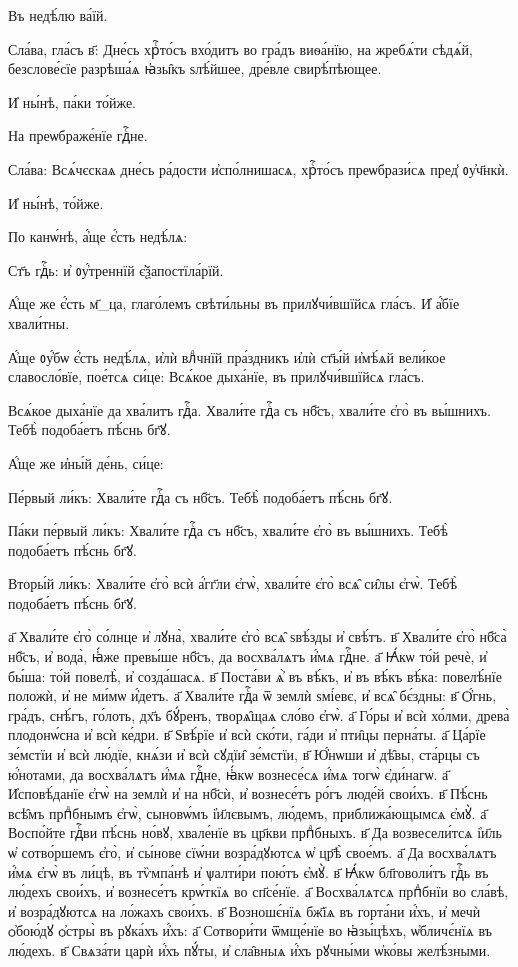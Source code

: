 \hKv Въ недѣ́лю ва́їй. 

\hKv Сла́ва, гла́съ в҃: Дне́сь хрⷭ҇то́съ вхо́дитъ во гра́дъ  виѳа́нїю, на жребѧ́ти сѣдѧ́й, безслове́сїе разрѣша́ѧ  ꙗ҆зы̑къ ѕлѣ́йшее, дре́вле свирѣ́пѣющее. 

\hKv И҆ ны́нѣ, па́ки то́йже. 

\hKv На преѡбраже́нїе гдⷭ҇не. 

\hKv Сла́ва: Всѧ́чєскаѧ дне́сь ра́дости и҆спо́лнишасѧ, хрⷭ҇то́съ  преѡбрази́сѧ пред̾ ᲂу҆ч҃нкѝ. 

\hKv И҆ ны́нѣ, то́йже. 

\hKv По канѡ́нѣ, а҆́ще є҆́сть недѣ́лѧ:  

\hKv Ст҃ъ гдⷭ҇ь: и҆ ᲂу҆́треннїй є҆ѯапостїла́рїй. 

\hKv А҆́ще же є҆́сть м҃_ца, глаго́лемъ свѣти́льны въ  прилꙋчи́вшїйсѧ гла́съ. И҆ а҆́бїе хвали́тны.  

\hKv А҆́ще ᲂу҆́бѡ є҆́сть недѣ́лѧ, и҆лѝ влⷣчнїй пра́здникъ  и҆лѝ ст҃ы́й и҆мѣ́ѧй вели́кое славосло́вїе, пое́тсѧ си́це:  Всѧ́кое дыха́нїе, въ прилꙋчи́вшїйсѧ гла́съ. 

\hKv Всѧ́кое дыха́нїе да хва́литъ гдⷭ҇а. Хвали́те гдⷭ҇а съ нб҃съ,  хвали́те є҆го̀ въ вы́шнихъ. Тебѣ̀ подоба́етъ пѣ́снь бг҃ꙋ. 

\hKv А҆́ще же и҆ны́й де́нь, си́це: 

\hKv Пе́рвый ли́къ: Хвали́те гдⷭ҇а съ нб҃съ. Тебѣ̀ подоба́етъ  пѣ́снь бг҃ꙋ. 

\hKv Па́ки пе́рвый ли́къ: Хвали́те гдⷭ҇а съ нб҃съ, хвали́те  є҆го̀ въ вы́шнихъ. Тебѣ̀ подоба́етъ пѣ́снь бг҃ꙋ. 

\hKv Вторы́й ли́къ: Хвали́те є҆го̀ всѝ а҆́гг҃ли є҆гѡ̀,  хвали́те є҆го̀ всѧ̑ си̑лы є҆гѡ̀. Тебѣ̀ подоба́етъ пѣ́снь  бг҃ꙋ. 

\hKv а҃ Хвали́те є҆го̀ со́лнце и҆ лꙋна̀, хвали́те є҆го̀ всѧ̑  ѕвѣ́зды и҆ свѣ́тъ. в҃ Хвали́те є҆го̀ нб҃са̀ нб҃съ, и҆  вода̀, ꙗ҆́же превы́ше нб҃съ, да восхва́лѧтъ и҆́мѧ гдⷭ҇не.  а҃ Ꙗ҆́кѡ то́й речѐ, и҆ бы́ша: то́й повелѣ̀, и҆  созда́шасѧ. в҃ Поста́ви  ѧ҆̀ въ  вѣ́къ, и҆ въ вѣ́къ вѣ́ка: повелѣ́нїе положѝ, и҆ не  ми́мѡ и҆́детъ. а҃ Хвали́те гдⷭ҇а ѿ землѝ ѕмі́евє, и҆  всѧ̑ бє́здны: в҃ Ѻ҆́гнь, гра́дъ, снѣ́гъ, го́лоть, дх҃ъ  бꙋ́ренъ, творѧ̑щаѧ сло́во є҆гѡ̀. а҃ Го́ры и҆ всѝ хо́лми,  древа̀ плодонѡ́сна и҆ всѝ ке́дри. в҃ Ѕвѣ́рїе и҆ всѝ  ско́ти, га́ди и҆ пти̑цы перна́ты. а҃ Ца́рїе зе́мстїи и҆  всѝ лю́дїе, кнѧ́зи и҆ всѝ сꙋдїи̑ зе́мстїи, в҃ Ю҆́нѡши и҆  дѣ̑вы, ста́рцы съ ю҆́нотами, да восхва́лѧтъ и҆́мѧ гдⷭ҇не,  ꙗ҆́кѡ вознесе́сѧ и҆́мѧ тогѡ̀ є҆ди́нагѡ. а҃  И҆сповѣ́данїе є҆гѡ̀ на землѝ и҆ на нб҃сѝ, и҆ вознесе́тъ  ро́гъ люде́й свои́хъ. в҃ Пѣ́снь всѣ̑мъ прпⷣбнымъ  є҆гѡ̀, сыновѡ́мъ і҆и҃лєвымъ, лю́демъ, приближа́ющымсѧ  є҆мꙋ̀. а҃ Воспо́йте гдⷭ҇ви пѣ́снь но́вꙋ, хвале́нїе въ  цр҃кви прпⷣбныхъ. в҃ Да возвесели́тсѧ і҆и҃ль ѡ҆  сотво́ршемъ є҆го̀, и҆ сы́нове сїѡ́ни возра́дꙋютсѧ ѡ҆ цр҃ѣ̀  свое́мъ. а҃ Да восхва́лѧтъ и҆́мѧ є҆гѡ̀ въ ли́цѣ, въ  тѷмпа́нѣ и҆ ѱалти́ри пою́тъ є҆мꙋ̀. в҃ Ꙗ҆́кѡ  бл҃говоли́тъ гдⷭ҇ь въ лю́дехъ   свои́хъ, и҆ вознесе́тъ крѡ́ткїѧ во сп҃се́нїе. а҃  Восхва́лѧтсѧ прпⷣбнїи во сла́вѣ, и҆ возра́дꙋютсѧ на  ло́жахъ свои́хъ. в҃ Возношє́нїѧ бж҃їѧ въ горта́ни и҆́хъ,  и҆ мечѝ ѻ҆бою́дꙋ ѻ҆стры̀ въ рꙋка́хъ и҆́хъ: а҃  Сотвори́ти ѿмще́нїе во ꙗ҆зы́цѣхъ, ѡ҆бличє́нїѧ въ  лю́дехъ. в҃ Свѧза́ти царѝ и҆́хъ пꙋ́ты, и҆ сла̑вныѧ и҆́хъ  рꙋчны́ми ѡ҆ко́вы желѣ́зными. 

